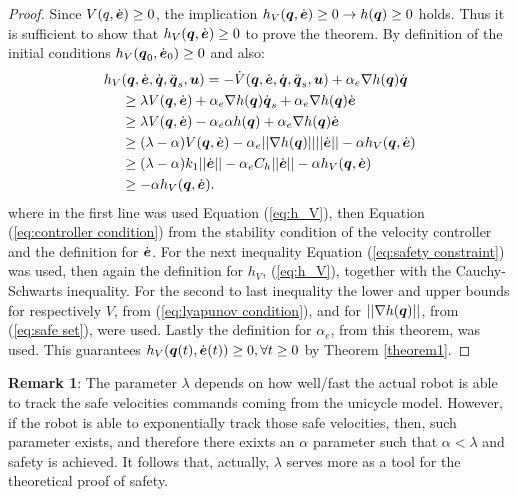 \begin{proof}
    Since $V(q,\dot{\boldsymbol{e}}) \geq 0$, the implication $h_V({\boldsymbol{q}},\dot{\boldsymbol{e}}) \geq 0 \rightarrow h({\boldsymbol{q}}) \geq 0$ holds. Thus it is sufficient to show that $h_V({\boldsymbol{q}},\dot{\boldsymbol{e}}) \geq 0$ to prove the theorem. By definition of the initial conditions $h_V({\boldsymbol{q}}_0,\dot{\boldsymbol{e}}_0) \geq 0$ and also:
    \begin{equation*}
        \begin{split}
            h_V&({\boldsymbol{q}},\dot{\boldsymbol{e}},\dot{{\boldsymbol{q}}},\ddot{{\boldsymbol{q}}}_s,\boldsymbol{u}) = -\dot{V}({\boldsymbol{q}},\dot{\boldsymbol{e}},\dot{{\boldsymbol{q}}},\ddot{{\boldsymbol{q}}}_s,\boldsymbol{u}) + \alpha_e \nabla h({\boldsymbol{q}})\dot{{\boldsymbol{q}}} \\
            & \geq \lambda V({\boldsymbol{q}},\dot{\boldsymbol{e}}) + \alpha_e \nabla h({\boldsymbol{q}})\dot{{\boldsymbol{q}}}_s + \alpha_e \nabla h({\boldsymbol{q}}) \dot{\boldsymbol{e}} \\
            & \geq \lambda V({\boldsymbol{q}},\dot{\boldsymbol{e}})  - \alpha_e \alpha h({\boldsymbol{q}}) + \alpha_e \nabla h({\boldsymbol{q}}) \dot{\boldsymbol{e}} \\
            & \geq (\lambda-\alpha) V({\boldsymbol{q}},\dot{\boldsymbol{e}}) - \alpha_e ||\nabla h({\boldsymbol{q}})|| ||\dot{\boldsymbol{e}}|| - \alpha h_V({\boldsymbol{q}},\dot{\boldsymbol{e}}) \\
            & \geq (\lambda-\alpha) k_1 ||\dot{\boldsymbol{e}}|| - \alpha_e C_h ||\dot{\boldsymbol{e}}|| - \alpha h_V({\boldsymbol{q}},\dot{\boldsymbol{e}}) \\
            & \geq - \alpha h_V({\boldsymbol{q}},\dot{\boldsymbol{e}}).
        \end{split}
    \end{equation*}
    where in the first line was used Equation (\ref{eq:h_V}), then Equation (\ref{eq:controller condition}) from the stability condition of the velocity controller and the definition for $\dot{\boldsymbol{e}}$. For the next inequality Equation (\ref{eq:safety constraint}) was used, then again the definition for $h_V$, (\ref{eq:h_V}), together with the Cauchy-Schwarts inequality. For the second to last inequality the lower and upper bounds for respectively $V$, from (\ref{eq:lyapunov condition}), and for $||\nabla h({\boldsymbol{q}})||$, from (\ref{eq:safe set}), were used. Lastly the definition for $\alpha_e$, from this theorem, was used. This guarantees $h_V({\boldsymbol{q}}(t),\dot{\boldsymbol{e}}(t)) \geq 0, \forall t \geq 0$ by Theorem \ref{theorem1}.
\end{proof}
\textbf{Remark 1}: The parameter $\lambda$ depends on how well/fast the actual robot is able to track the safe velocities commands coming from the unicycle model. However, if the robot is able to exponentially track those safe velocities, then, such parameter exists, and therefore there exixts an $\alpha$ parameter such that $\alpha <\lambda$ and safety is achieved. It follows that, actually, $\lambda$ serves more as a tool for the theoretical proof of safety.